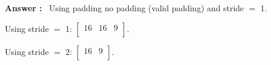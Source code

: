 \begin{list}{
\textbf{Answer :}~}{}
Using padding no padding (valid padding) and stride $=$ 1.

\item \noindent

Using stride $=$ 1:
$\left[\begin{smallmatrix}
16 & 16 & 9\\
\end{smallmatrix}\right]$.

Using stride $=$ 2:
$\left[\begin{smallmatrix}
16 & 9\\
\end{smallmatrix}\right]$.
\end{list}